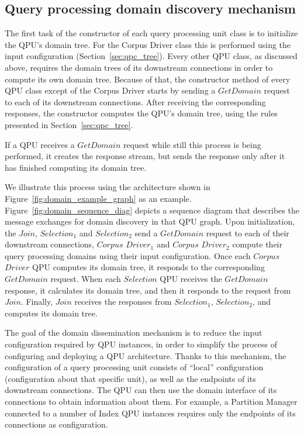 \subsection{Query processing domain discovery mechanism}

The first task of the constructor of each query processing unit class is to initialize the QPU's domain tree.
For the Corpus Driver class this is performed using the input configuration (Section~\ref{sec:qpc_tree}).
Every other QPU class, as discussed above, requires the domain trees of its downstream connections in order to compute its own domain tree.
Because of that, the constructor method of every QPU class except of the Corpus Driver starts by sending a $GetDomain$ request to each
of its downstream connections.
After receiving the corresponding responses, the constructor computes the QPU's domain tree, using the rules presented in Section~\ref{sec:qpc_tree}.

If a QPU receives a $GetDomain$ request while still this process is being performed, it creates the response stream,
but sends the response only after it has finished computing its domain tree.

We illustrate this process using the architecture shown in Figure~\ref{fig:domain_example_graph} as an example.
Figure~\ref{fig:domain_sequence_diag} depicts a sequence diagram that describes the message exchanges for domain discovery
in that QPU graph.
Upon initialization, the $Join$, $Selection_1$ and $Selection_2$ send a $GetDomain$ request to each of their downstream
connections,
$Corpus$ $Driver_1$ and $Corpus$ $Driver_2$ compute their query processing domains using their input configuration.
Once each $Corpus$ $Driver$ QPU computes its domain tree, it responds to the corresponding $GetDomain$ request.
When each $Selection$ QPU receives the $GetDomain$ response, it calculates its domain tree, and then it responds to the request from $Join$.
Finally, $Join$ receives the responses from $Selection_1$, $Selection_2$, and computes its domain tree.

\medskip
\noindent
The goal of the domain dissemination mechanism is to reduce the input configuration required by QPU instances,
in order to simplify the process of configuring and deploying a QPU architecture.
Thanks to this mechanism, the configuration of a query processing unit consists of ``local'' configuration
(configuration about that specific unit), as well as the endpoints of its downstream connections.
The QPU can then use the domain interface of its connections to obtain information about them.
For example, a Partition Manager connected to a number of Index QPU instances requires only the endpoints of its
connections as configuration.

